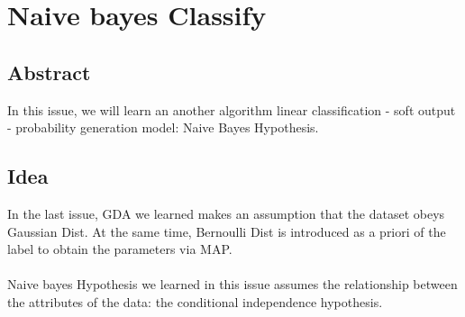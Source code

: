 \documentclass{report}
\begin{document}
\section{Naive bayes Classify}
\subsection{Abstract}
In this issue, we will learn an another algorithm linear classification - soft output - probability generation model: Naive Bayes Hypothesis.
\subsection{Idea}
In the last issue, GDA we learned makes an assumption that the dataset obeys Gaussian Dist. At the same time, Bernoulli Dist is introduced as a priori of the label to obtain the parameters via MAP.\\\\
Naive bayes Hypothesis we learned in this issue assumes the relationship between the attributes of the data: the conditional independence hypothesis.
\end{document}
